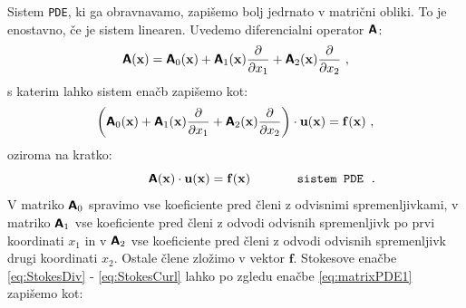 Sistem \texttt{PDE}, ki ga obravnavamo, zapišemo bolj jedrnato v matrični obliki. To je enostavno, če je sistem linearen. Uvedemo diferencialni operator $\bm{\mathsf{A}}$:
\begin{equation}
	\bm{\mathsf{A}}(\mathbf{x}) = \bm{\mathsf{A}}_0(\mathbf{x}) + \bm{\mathsf{A}}_1(\mathbf{x}) \frac{\partial}{\partial x_1} + \bm{\mathsf{A}}_2(\mathbf{x}) \frac{\partial}{\partial x_2} \ ,
	\label{eq:AMatrixDefinition}
\end{equation}
s katerim lahko sistem enačb zapišemo kot:
\begin{equation}
	\left(\bm{\mathsf{A}}_0(\mathbf{x}) + \bm{\mathsf{A}}_1(\mathbf{x}) \frac{\partial}{\partial x_1} + \bm{\mathsf{A}}_2(\mathbf{x}) \frac{\partial}{\partial x_2}\right) \cdot \mathbf{u}(\mathbf{x}) = \mathbf{f}(\mathbf{x}) \ ,
	\label{eq:matrixPDE1}
\end{equation}
oziroma na kratko:
\begin{equation}
	\hspace{1.5cm}
	\bm{\mathsf{A}}(\mathbf{x}) \cdot \mathbf{u}(\mathbf{x}) = \mathbf{f}(\mathbf{x})
	\hspace{1.3cm} \texttt{sistem PDE .}
	\label{eq:compactPDE}
\end{equation}
V matriko $\bm{\mathsf{A}}_0$ spravimo vse koeficiente pred členi z odvisnimi spremenljivkami, v matriko $\bm{\mathsf{A}}_1$ vse koeficiente pred členi z odvodi odvisnih spremenljivk po prvi koordinati $x_1$ in v $\bm{\mathsf{A}}_2$ vse koeficiente pred členi z odvodi odvisnih spremenljivk drugi koordinati $x_2$. Ostale člene zložimo v vektor $\mathbf{f}$. Stokesove enačbe \eqref{eq:StokesDiv} - \eqref{eq:StokesCurl} lahko po zgledu enačbe \eqref{eq:matrixPDE1} zapišemo kot:

